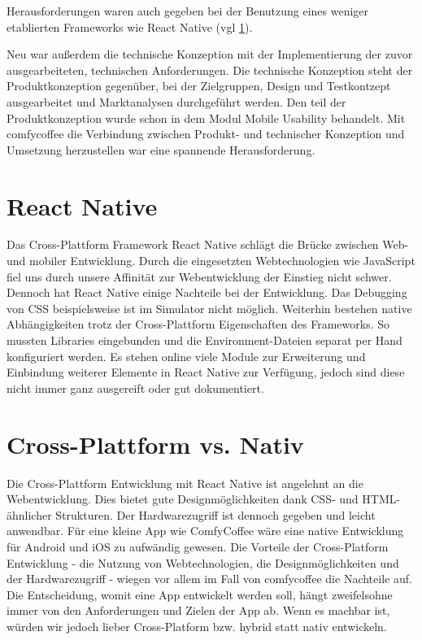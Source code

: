 Herausforderungen waren auch gegeben bei der Benutzung eines weniger etablierten Frameworks wie React Native (vgl \ref{sec:reactnative}).

Neu war außerdem die technische Konzeption mit der Implementierung der zuvor ausgearbeiteten, technischen Anforderungen. Die technische Konzeption steht der Produktkonzeption gegenüber, bei der Zielgruppen, Design und Testkontzept ausgearbeitet und Marktanalysen durchgeführt werden. Den teil der Produktkonzeption wurde schon in dem Modul Mobile Usability behandelt. Mit comfycoffee die Verbindung zwischen Produkt- und technischer Konzeption und Umsetzung herzustellen war eine spannende Herausforderung.

\section{React Native}
\label{sec:reactnative}
Das Cross-Plattform Framework React Native schlägt die Brücke zwischen Web- und mobiler Entwicklung. Durch die eingesetzten Webtechnologien wie JavaScript fiel uns durch unsere Affinität zur Webentwicklung der Einstieg nicht schwer. Dennoch hat React Native einige Nachteile bei der Entwicklung. Das Debugging von CSS beispielsweise ist im Simulator nicht möglich. Weiterhin bestehen native Abhängigkeiten trotz der Cross-Plattform Eigenschaften des Frameworks. So mussten Libraries eingebunden und die Environment-Dateien separat per Hand konfiguriert werden. Es stehen online viele Module zur Erweiterung und Einbindung weiterer Elemente in React Native zur Verfügung, jedoch sind diese nicht immer ganz ausgereift oder gut dokumentiert.

\section{Cross-Plattform vs. Nativ}
Die Cross-Plattform Entwicklung mit React Native ist angelehnt an die Webentwicklung. Dies bietet gute Designmöglichkeiten dank CSS- und HTML-ähnlicher Strukturen. Der Hardwarezugriff ist dennoch gegeben und leicht anwendbar. Für eine kleine App wie ComfyCoffee wäre eine native Entwicklung für Android und iOS zu aufwändig gewesen. Die Vorteile der Cross-Platform Entwicklung - die Nutzung von Webtechnologien, die Designmöglichkeiten und der Hardwarezugriff - wiegen vor allem im Fall von comfycoffee die Nachteile auf. Die Entscheidung, womit eine App entwickelt werden soll, hängt zweifelsohne immer von den Anforderungen und Zielen der App ab. Wenn es machbar ist, würden wir jedoch lieber Cross-Platform bzw. hybrid statt nativ entwickeln.